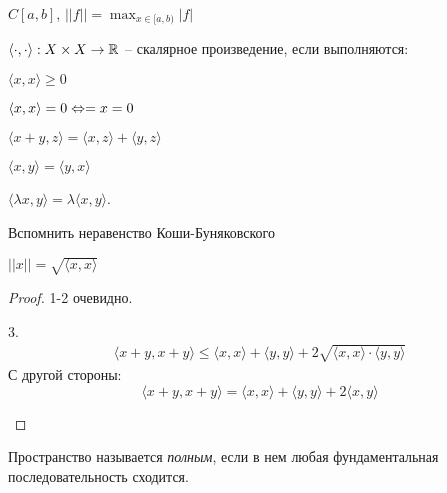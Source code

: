     \begin{Example}
        $C[a, b]$, $||f|| = \max_{x \in [a, b)} |f|$ 
    \end{Example}

    \begin{Def}
        $\langle \cdot, \cdot \rangle : X \times X \to \mathbb{R}$ -- скалярное произведение, если выполняются:
        \begin{MyList}
            \item $\langle x, x\rangle \geqslant 0$ 
            \item[] $\langle x, x\rangle = 0 \Leftrightarrow = x = 0$
            \item $\langle x + y, z\rangle = \langle x, z\rangle + \langle y, z\rangle$
            \item $\langle x, y\rangle = \langle y, x\rangle$
            \item $\langle \lambda x, y\rangle = \lambda \langle x, y\rangle$. 
        \end{MyList} 
    \end{Def}

    \begin{Ex}
        Вспомнить неравенство Коши-Буняковского
    \end{Ex}

    \begin{Prop}
        $||x|| = \sqrt{\langle x, x\rangle}$
    \end{Prop}

    \begin{proof}
        1-2 очевидно.
        \begin{MyList}
            \item[3.]
            \begin{align*}
                \langle x + y, x + y \rangle \leqslant \langle x, x\rangle + \langle y, y\rangle + 2\sqrt{\langle x, x\rangle \cdot \langle y, y\rangle}
            \end{align*}
            С другой стороны:
            \[\langle x + y, x + y \rangle = \langle x, x\rangle + \langle y, y\rangle + 2 \langle x, y\rangle\]
        \end{MyList}
    \end{proof}

    \begin{Def}
        Пространство называется \textit{полным}, если в нем любая фундаментальная последовательность сходится.
    \end{Def}


